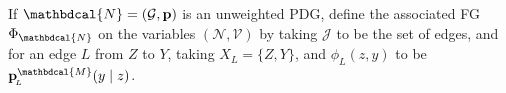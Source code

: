 \documentclass[letterpaper]{article} %
\theoremstyle{plain}
\theoremstyle{definition}
\theoremstyle{remark}
\newcommand\mat[1]{\mathbf{#1}}
\newcommand{\bp}[1][L]{\mat{p}_{\!_{#1}\!}}
\newcommand{\V}{\mathcal V}
\newcommand{\N}{\mathcal N}
\newcommand{\Ed}{\mathcal E}
\newcommand{\dg}[1]{\mathbdcal{#1}}
\newcommand{\WFGof}[1]{\Psi_{{#1}}}
\newcommand{\FGof}[1]{\Phi_{{#1}}}
\newcommand{\Gr}{\mathcal G}
\newcommand{\varsNV}[1][\N,\V]{(#1)}
\begin{document}
\begin{defn}\label{def:PDG2fg}
If $\dg N = (\Gr, \mat p)$ is an unweighted PDG, define   
the associated FG $\FGof{\dg N}$ on the 
variables $\varsNV$ by
taking $\mathcal J$ to be the set of edges, 
and for an edge $L$ from $Z$ to $Y$, taking $X_{L} = \{Z,Y\}$, and $\phi_L(z,y)$ to be
$\bp^{\dg M}(y \mid z)$.
\end{defn}
\end{document}
